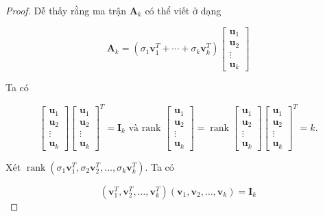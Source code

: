 \documentclass[12pt,a4paper,oneside]{report}
\numberwithin{equation}{section}
\begin{document}
\begin{proof}
Dễ thấy rằng ma trận $\mathbf{A}_{k}$ có thể viết ở dạng

$$
\mathbf{A}_{k}=\left(\sigma_{1} \mathbf{v}_{1}^{T}+\cdots+\sigma_{k} \mathbf{v}_{k}^{T}\right)\left[\begin{array}{c}
	\mathbf{u}_{1} \\
	\mathbf{u}_{2} \\
	\vdots \\
	\mathbf{u}_{k}
\end{array}\right]
$$

Ta có

$$
\left[\begin{array}{c}
	\mathbf{u}_{1} \\
	\mathbf{u}_{2} \\
	\vdots \\
	\mathbf{u}_{k}
\end{array}\right]\left[\begin{array}{c}
	\mathbf{u}_{1} \\
	\mathbf{u}_{2} \\
	\vdots \\
	\mathbf{u}_{k}
\end{array}\right]^{T}=\mathbf{I}_{k} \text { và rank }\left[\begin{array}{c}
	\mathbf{u}_{1} \\
	\mathbf{u}_{2} \\
	\vdots \\
	\mathbf{u}_{k}
\end{array}\right]=\operatorname{rank}\left[\begin{array}{c}
	\mathbf{u}_{1} \\
	\mathbf{u}_{2} \\
	\vdots \\
	\mathbf{u}_{k}
\end{array}\right]\left[\begin{array}{c}
	\mathbf{u}_{1} \\
	\mathbf{u}_{2} \\
	\vdots \\
	\mathbf{u}_{k}
\end{array}\right]^{T}=k .
$$

Xét $\operatorname{rank}\left(\sigma_{1} \mathbf{v}_{1}^{T}, \sigma_{2} \mathbf{v}_{2}^{T}, \ldots, \sigma_{k} \mathbf{v}_{k}^{T}\right)$. Ta có

$$
\left(\mathbf{v}_{1}^{T}, \mathbf{v}_{2}^{T}, \ldots, \mathbf{v}_{k}^{T}\right)\left(\mathbf{v}_{1}, \mathbf{v}_{2}, \ldots, \mathbf{v}_{k}\right)=\mathbf{I}_{k}
$$


\end{proof}
\end{document}

